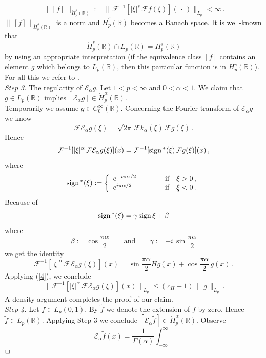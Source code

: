 \documentclass[12pt]{article}
\newenvironment{proof}{\begin{trivlist}
    \item[\hskip\labelsep{\it Proof.}]}{$\hfill\Box$\end{trivlist}}
\newcommand{\RR}{\mathbb{R}}
\newcommand{\cs}{{\mathcal S}}
\newcommand{\ce}{{\mathcal E}}
\newcommand{\re}{\mathbb{R}}
\newcommand{\cf}{{\mathcal{F}}}
\newcommand{\cfi}{{\mathcal{F}}^{-1}}
\newcommand{\sign}{{\rm sign} \, }
\newcommand{\mig}[1]{\textcolor{blue}{#1}}
\begin{document}
\begin{proof}
\[
\|\, [f]\, \|_{\dot{H}^s_p(\RR)} := \|\, \cfi [|\xi|^s \, \cf f (\xi)](\,\cdot \, )\|_{L_p}
<\infty \, .
\]
$\|\, [f]\,\|_{ \dot{H}^s_p (\re)}$ is a norm and $\dot{H}^s_p (\re)$  becomes a Banach space.
It is well-known that
\[
\dot{H}^s_p (\re) \cap L_p (\re) = H^s_p (\re)
\]
by using an appropriate interpretation (if the equivalence class  $[f]$ contains 
an element $g$ which  belongs to $L_p(\re)$, then this particular function is in ${H}^s_p (\re)$). 
For all this we refer to \cite[Chapter 6]{BL}.
\\
{\em Step 3.} The regularity of $\ce_\alpha g$.
Let $1<p<\infty$ and $0 < \alpha < 1$.
We claim that
$g \in L_p (\re)$ implies $[\ce_\alpha g] \in \dot{H}^{\alpha}_p(\re)$.
\\
Temporarily we assume $g \in C_0^\infty (\re)$.
Concerning the  Fourier transform of $\ce_\alpha g$ we know
\[
\cf \ce_\alpha g (\xi) = \sqrt{2 \pi} \, \cf k_\alpha (\xi ) \, \cf g(\xi)\, .
\]
Hence
\[
\cfi [|\xi|^{\alpha} \, \cf \ce_\alpha  g (\xi)](x) =   
\cfi [\sign^* (\xi)\, \cf g (\xi)](x)\, ,
\]
where
\[
\sign^*(\xi):= \left\{
\begin{array}{lll}
e^{-i \pi \alpha/2} & \qquad & \mbox{if}\quad \xi>0\, , 
\\
e^{i \pi \alpha/2} & \qquad & \mbox{if}\quad \xi<0\, .
\end{array}
\right.
\]
Because of  
\[
\sign^*(\xi) = \gamma \, \sign \xi + \beta
\]
where
\[
\beta := \cos \frac{\pi \alpha}{2} \qquad \mbox{and}
\qquad \gamma := -i \, \sin \frac{\pi \alpha}{2} 
\]
we get the identity
\[
\cfi [|\xi|^{\alpha} \, \cf \ce_\alpha  g (\xi)](x) =    \sin \frac{\pi \alpha}{2} Hg(x) + \cos \frac{\pi \alpha}{2}\, g(x)\, .
\]
Applying (\ref{4}), we conclude
\[
\| \, \cfi [|\xi|^{\alpha} \, \cf \ce_\alpha  g (\xi)](x)\, \|_{L_p} \le 
(c_H +1) \, \| \, g\, \|_{L_p}\, .
\]
A density argument completes the proof of our claim.
\\
{\em Step 4.} 
Let $f \in L_p (0,1)$. By $\tilde{f}$ we denote the extension  of $f$ by zero.
Hence $\tilde{f} \in L_p (\re)$.
Applying Step 3 we conclude
$[\ce_\alpha \tilde{f}] \in \dot{H}^{\alpha}_p(\re)$.
Observe
\[
\ce_\alpha \tilde{f} (x)= \frac{1}{\Gamma (\alpha)} \int_{-\infty}^\infty 
\]
\end{proof}
\end{document}
